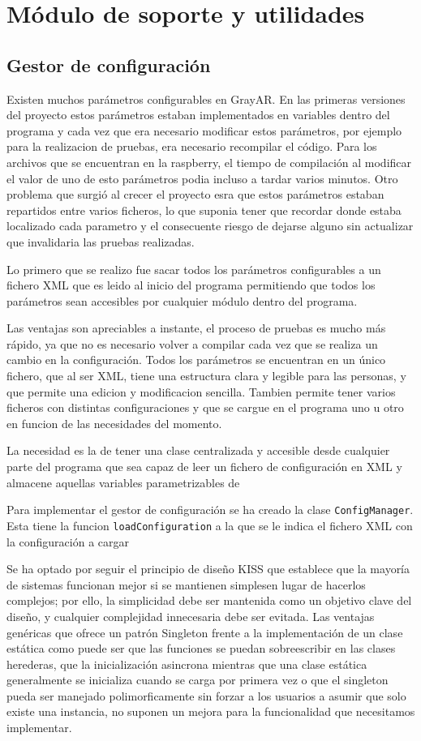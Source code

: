 \section{Módulo de soporte y utilidades}
\subsection{Gestor de configuración}
Existen muchos parámetros configurables en GrayAR. En las primeras versiones del proyecto estos parámetros estaban implementados en variables dentro del programa y cada vez que era necesario modificar estos parámetros, por ejemplo para la realizacion de pruebas, era necesario recompilar el código. Para los archivos que se encuentran en la raspberry, el tiempo de compilación al modificar el valor de uno de esto parámetros podia incluso a tardar varios minutos. Otro problema que surgió al crecer el proyecto esra que estos parámetros estaban repartidos entre varios ficheros, lo que suponia tener que recordar donde estaba localizado cada parametro y el consecuente riesgo de dejarse alguno sin actualizar que invalidaria las pruebas realizadas.

Lo primero que se realizo fue sacar todos los parámetros configurables a un fichero \acs{XML} que es leido al inicio del programa permitiendo que todos los parámetros sean accesibles por cualquier módulo dentro del programa.

Las ventajas son apreciables a instante, el proceso de pruebas es mucho más rápido, ya que no es necesario volver a compilar cada vez que se realiza un cambio en la configuración. Todos los parámetros se encuentran en un único fichero, que al ser \acs{XML}, tiene una estructura clara y legible para las personas, y que permite una edicion y modificacion sencilla. Tambien permite tener varios ficheros con distintas configuraciones y que se cargue en el programa uno u otro en funcion de las necesidades del momento.
 
La necesidad es la de tener una clase centralizada y accesible desde cualquier parte del programa que sea capaz de leer un fichero de configuración en \acs{XML} y almacene aquellas variables parametrizables de

Para implementar el gestor de configuración se ha creado la clase  \texttt{ConfigManager}. Esta tiene la funcion  \texttt{loadConfiguration} a la que se le indica el fichero \acs{XML} con la configuración a cargar 

Se ha optado por seguir el principio de diseño \acs{KISS} que establece que la mayoría de sistemas funcionan mejor si se mantienen simplesen lugar de hacerlos complejos; por ello, la simplicidad debe ser mantenida como un objetivo clave del diseño, y cualquier complejidad innecesaria debe ser evitada. Las ventajas genéricas que ofrece un patrón Singleton frente a la implementación de un clase estática como puede ser que las funciones se puedan sobreescribir en las clases herederas, que la inicialización asincrona mientras que una clase estática generalmente se inicializa cuando se carga por primera vez o que el singleton pueda ser manejado polimorficamente sin forzar a los usuarios a asumir que solo existe una instancia, no suponen un mejora para la funcionalidad que necesitamos implementar. 

